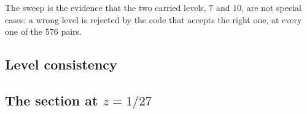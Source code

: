 \documentclass[11pt,a4paper]{article}
\theoremstyle{remark}
\begin{document}
\begin{table}[h]
\centering\scriptsize\setlength{\tabcolsep}{3pt}

\caption{Top: the computed $T(E\times E')$ against each family's certified $T$. Bottom: $T(E\times E)$ at the $s_7$ points of Picard
number $20$, with the CM order identified by computation from the model's $j$. The bottom agreement is forced (an elliptic point of
the modular curve is a CM point), so it is a consistency check.}\label{tab:readings}
\end{table}

\begin{table}[h]
\centering\small

\caption{The same code at every level: each computed lattice is compared with every target $U\oplus\langle2m\rangle$. The isometry
exists exactly when $m=n$.}\label{tab:sweep}
\end{table}

The sweep is the evidence that the two carried levels, $7$ and $10$, are not special cases: a wrong level is rejected by the code that
accepts the right one, at every one of the 576 pairs.

\subsection{Level consistency}\label{sec:t3}

\begin{table}[h]
\centering\small

\caption{The level $n$ read from the lattice certificate against the level read from the modular side (an eta-quotient Hauptmodul
with Newman's conditions and an Atkin--Lehner check). Both legs start from the same operator, so agreement is a consistency check and
not an independent measurement.}\label{tab:t3}
\end{table}

\subsection{The section at $z=1/27$}\label{sec:section}

\begin{table}[h]
\centering\small

\caption{The generic member and the three $\rho=20$ points of $s_7$ (lattice arithmetic and exact reduction of the model). At
$z=\infty$ the Mordell--Weil rank is $0$.}\label{tab:tw2}
\end{table}
\end{document}
